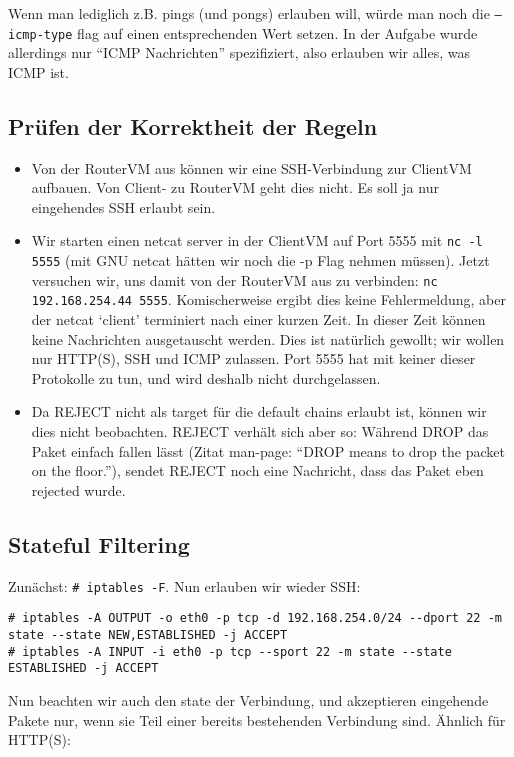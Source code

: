 \documentclass[10pt,a4paper]{article}
\begin{document}
Wenn man lediglich z.B. pings (und pongs) erlauben will, würde man noch die \texttt{--icmp-type} flag auf einen entsprechenden
Wert setzen. In der Aufgabe wurde allerdings nur ``ICMP Nachrichten'' spezifiziert, also erlauben wir alles, was ICMP ist.

\subsection{Prüfen der Korrektheit der Regeln}
\begin{itemize}
\item Von der RouterVM aus können wir eine SSH-Verbindung zur ClientVM aufbauen. Von Client- zu RouterVM geht dies nicht.
	  Es soll ja nur eingehendes SSH erlaubt sein.
\item Wir starten einen netcat server in der ClientVM auf Port 5555 mit \texttt{nc -l 5555} (mit GNU netcat hätten wir noch die -p Flag nehmen müssen).
	  Jetzt versuchen wir, uns damit von der RouterVM aus zu verbinden: \texttt{nc 192.168.254.44 5555}. Komischerweise ergibt dies keine Fehlermeldung,
	  aber der netcat `client' terminiert nach einer kurzen Zeit. In dieser Zeit können keine Nachrichten ausgetauscht werden.
	  Dies ist natürlich gewollt; wir wollen nur HTTP(S), SSH und ICMP zulassen. Port 5555 hat mit keiner dieser Protokolle zu tun, und wird deshalb
	  nicht durchgelassen.
\item Da REJECT nicht als target für die default chains erlaubt ist, können wir dies nicht beobachten. REJECT verhält sich aber so:
	  Während DROP das Paket einfach fallen lässt (Zitat man-page: ``DROP means to drop the packet on the floor.''), sendet REJECT
	  noch eine Nachricht, dass das Paket eben rejected wurde.
\end{itemize}

\subsection{Stateful Filtering}
Zunächst: \texttt{\# iptables -F}.
Nun erlauben wir wieder SSH:

\begin{verbatim}
# iptables -A OUTPUT -o eth0 -p tcp -d 192.168.254.0/24 --dport 22 -m state --state NEW,ESTABLISHED -j ACCEPT
# iptables -A INPUT -i eth0 -p tcp --sport 22 -m state --state ESTABLISHED -j ACCEPT
\end{verbatim}
Nun beachten wir auch den state der Verbindung, und akzeptieren eingehende Pakete nur, wenn sie Teil einer bereits bestehenden Verbindung sind.
Ähnlich für HTTP(S):
\end{document}
